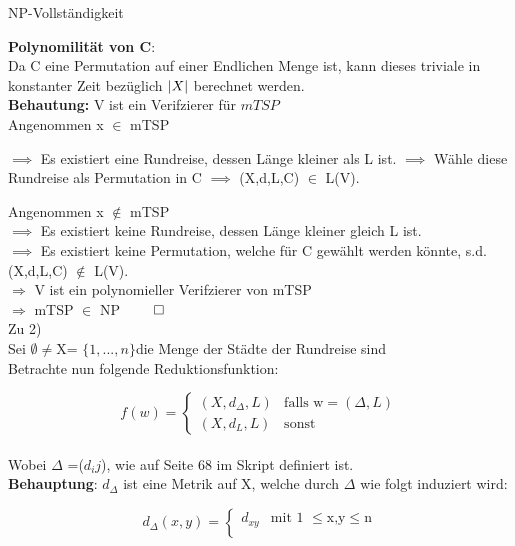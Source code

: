 \documentclass[answers]{submit}
\begin{document}
\begin{exercise}[7]{NP-Vollständigkeit}
{  \textbf{Polynomilität von C}: \\

  Da C eine Permutation auf einer Endlichen Menge ist, kann dieses triviale in konstanter Zeit bezüglich $\left\vert X \right\vert$ berechnet werden. \\

  \textbf{Behautung:} V ist ein Verifzierer für $mTSP$ \\

  Angenommen x $\in$ mTSP

  $\implies$ Es existiert eine Rundreise, dessen Länge kleiner als L ist.
  $\implies$ Wähle diese Rundreise als Permutation in C
  $\implies$ (X,d,L,C) $\in$ L(V).

  Angenommen x $\notin$ mTSP \\

  $\implies$ Es existiert keine Rundreise, dessen Länge kleiner gleich L ist. \\

  $\implies$ Es existiert keine Permutation, welche für C gewählt werden könnte, s.d. (X,d,L,C) $\notin$ L(V). \\

  $\Rightarrow$ V ist ein polynomieller Verifzierer von mTSP \\

  $\Rightarrow$ mTSP $\in$ NP $\qed$ \\

  Zu 2) \\

  Sei  $\emptyset \neq $X= $\{1,...,n \}$die Menge der Städte der Rundreise sind \\

  Betrachte nun folgende Reduktionsfunktion:

  $$f(w)=\begin{cases}
      (X,d_{\Delta},L) & \text{falls w} = (\Delta ,L) \\
      (X,d_L,L)        & \text{sonst}
    \end{cases}$$ \\

  Wobei $\Delta$ =($d_ij$), wie auf Seite 68 im Skript definiert ist. \\

  \textbf{Behauptung}: $d_{\Delta}$ ist eine Metrik auf X, welche durch $\Delta$ wie folgt induziert wird:

  $$d_{\Delta}(x,y)=\begin{cases}
      d_{xy} & \text{mit 1 } \leq \text{x,y} \leq \text{n} \\
    \end{cases}$$ \\

}
\end{exercise}
\end{document}
